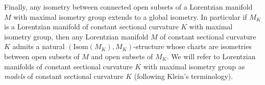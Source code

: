 Finally, any isometry between connected open subsets of a Lorentzian manifold $M$ with maximal isometry group extends to a global isometry. In particular if $M_K$ is a Lorentzian manifold of constant sectional curvature $K$ with maximal isometry group, then any Lorentzian manifold $M$ of constant sectional curvature $K$ admits a natural $(\text{Isom}(M_K), M_K)$-structure whose charts are isometries between open subsets of $M$ and open subsets of $M_K$. We will refer to Lorentzian manifolds of constant sectional curvature $K$ with maximal isometry group as \textit{models} of constant sectional curvature $K$ (following Klein's terminology).  